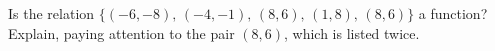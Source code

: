 Is the relation $\{(-6,-8),\,(-4,-1),\,(8,6),\,(1,8),\,(8,6)\}$ a function? Explain, paying attention to the pair $(8,6)$, which is listed twice.
